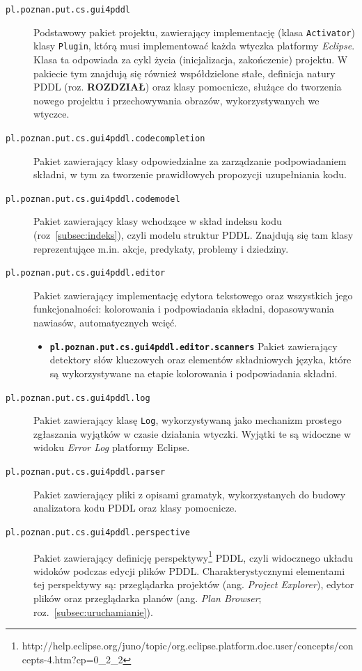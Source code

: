 \begin{description}
\item [\texttt{pl.poznan.put.cs.gui4pddl}] Podstawowy pakiet projektu, zawierający implementację (klasa \texttt{Activator}) klasy \texttt{Plugin}, którą musi implementować każda wtyczka platformy \emph{Eclipse}. Klasa ta odpowiada za cykl życia (inicjalizacja, zakończenie) projektu. W pakiecie tym znajdują się również współdzielone stałe, definicja natury PDDL (roz. \textbf{ROZDZIAŁ}) oraz klasy pomocnicze, służące do tworzenia nowego projektu i przechowywania obrazów, wykorzystywanych we wtyczce.
\item [\texttt{pl.poznan.put.cs.gui4pddl.codecompletion}] Pakiet zawierający klasy odpowiedzialne za zarządzanie podpowiadaniem składni, w tym za tworzenie prawidłowych propozycji uzupełniania kodu.
\item [\texttt{pl.poznan.put.cs.gui4pddl.codemodel}] Pakiet zawierający klasy wchodzące w skład indeksu kodu (roz~\ref{subsec:indeks}), czyli modelu struktur PDDL. Znajdują się tam klasy reprezentujące m.in. akcje, predykaty, problemy i dziedziny.
\item [\texttt{pl.poznan.put.cs.gui4pddl.editor}] Pakiet zawierający implementację edytora tekstowego oraz wszystkich jego funkcjonalności: kolorowania i podpowiadania składni, dopasowywania nawiasów, automatycznych wcięć.
\begin{itemize}
\item \texttt{\textbf{pl.poznan.put.cs.gui4pddl.editor.scanners}} Pakiet zawierający detektory słów kluczowych oraz elementów składniowych języka, które są wykorzystywane na etapie kolorowania i podpowiadania składni.
\end{itemize}
\item [\texttt{pl.poznan.put.cs.gui4pddl.log}] Pakiet zawierający klasę \texttt{Log}, wykorzystywaną jako mechanizm prostego zgłaszania wyjątków w czasie działania wtyczki. Wyjątki te są widoczne w widoku \textit{Error Log} platformy Eclipse.
\item [\texttt{pl.poznan.put.cs.gui4pddl.parser}] Pakiet zawierający pliki z opisami gramatyk, wykorzystanych do budowy analizatora kodu PDDL oraz klasy pomocnicze.
\item [\texttt{pl.poznan.put.cs.gui4pddl.perspective}] Pakiet zawierający definicję perspektywy\footnote{http://help.eclipse.org/juno/topic/org.eclipse.platform.doc.user/concepts/concepts-4.htm?cp=0\_2\_2} PDDL, czyli widocznego układu widoków podczas edycji plików PDDL. Charakterystycznymi elementami tej perspektywy są: przeglądarka projektów (ang. \textit{Project Explorer}), edytor plików oraz przeglądarka planów (ang. \textit{Plan Browser}; roz.~\ref{subsec:uruchamianie}).

\end{description}
